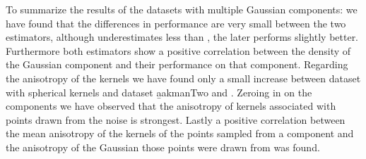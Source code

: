 	To summarize the results of the datasets with multiple Gaussian components: we have found that the differences in performance are very small between the two estimators, although \sambe underestimates less than \mbe, the later performs slightly better.
	Furthermore both estimators show a positive correlation between the density of the Gaussian component and their performance on that component.
	Regarding the anisotropy of the kernels we have found only a small increase between dataset with spherical kernels and dataset \b
	aakmanTwo and \baakmanThree. 
	Zeroing in on the components we have observed that the anisotropy of kernels associated with points drawn from the noise is strongest.
	Lastly a positive correlation between the mean anisotropy of the kernels of the points sampled from a component and the anisotropy of the Gaussian those points were drawn from was found. 